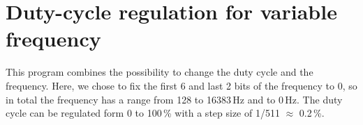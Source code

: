 \section{Duty-cycle regulation for variable frequency}

This program combines the possibility to change the duty cycle and the frequency. Here, we chose to fix the first 6 and last 2 bits of the frequency to 0, so in total the frequency has a range from 128 to 16383\,Hz and to 0\,Hz. The duty cycle can be regulated form 0 to 100\,\% with a step size of 1/511 $\approx$ 0.2\,\%.





